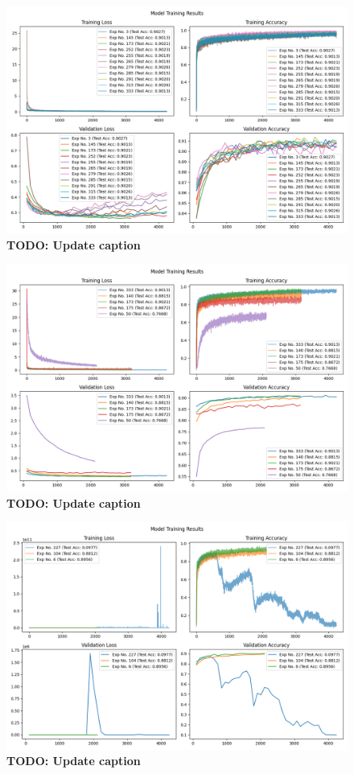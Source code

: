 \documentclass[10pt]{amsart}
\begin{document}
\begin{figure}[h]
	\centering
	\includegraphics[width=.9\textwidth]{../visualizations/model_training_results_vis.png}
 	\caption{\textbf{TODO: Update caption}}\label{fig:f1}
\end{figure}

\begin{figure}[h]
	\centering
	\includegraphics[width=.9\textwidth]{../visualizations/model_training_results_vis_0.png}
 	\caption{\textbf{TODO: Update caption}}\label{fig:f2}
\end{figure}

\begin{figure}[h]
	\centering
	\includegraphics[width=.9\textwidth]{../visualizations/model_training_results_vis_1.png}
 	\caption{\textbf{TODO: Update caption}}\label{fig:f3}
\end{figure}
\end{document}
